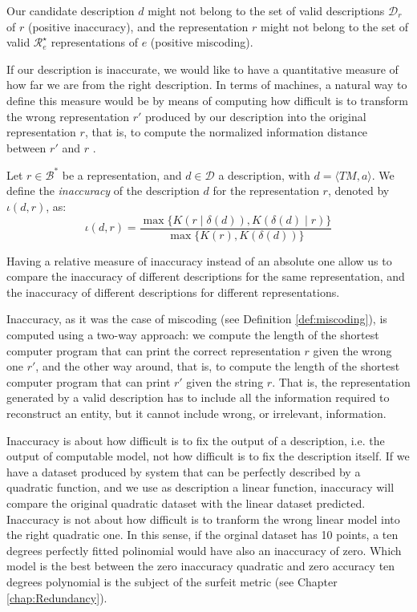 Our candidate description $d$ might not belong to the set of valid descriptions $\mathcal{D}_r$ of $r$ (positive inaccuracy), and the representation $r$ might not belong to the set of valid $\mathcal{R}^\star_e$ representations of $e$ (positive miscoding).

If our description is inaccurate, we would like to have a quantitative measure of how far we are from the right description. In terms of machines, a natural way to define this measure would be by means of computing how difficult is to transform the wrong representation $r'$ produced by our description into the original representation $r$, that is, to compute the normalized information distance between $r'$ and $r$ .

\begin{definition} [Inaccuracy]
\label{def:inaccuracy:inaccuracy:inaccuracy}
Let $r \in \mathcal{B}^\ast$ be a representation, and $d \in \mathcal{D}$ a description, with $d = \langle TM, a \rangle$. We define the \emph{inaccuracy} of the description $d$ for the representation $r$, denoted by $\iota(d, r)$, as:
\[
\iota(d, r) = \frac{ \max\{ K \left(r \mid \delta(d) \right), K \left( \delta(d) \mid r \right) \} } { \max\{ K(r), K \left(\delta(d) \right) \} }
\]
\end{definition}

Having a relative measure of inaccuracy instead of an absolute one allow us to compare the inaccuracy of different descriptions for the same representation, and the inaccuracy of different descriptions for different representations.

Inaccuracy, as it was the case of miscoding (see Definition \ref{def:miscoding}), is computed using a two-way approach: we compute the length of the shortest computer program that can print the correct representation $r$ given the wrong one $r'$, and the other way around, that is, to compute the length of the shortest computer program that can print $r'$ given the string $r$. That is, the representation generated by a valid description has to include all the information required to reconstruct an entity, but it cannot include wrong, or irrelevant, information. 

\begin{example}
Inaccuracy is about how difficult is to fix the output of a description, i.e. the output of computable model, not how difficult is to fix the description itself. If we have a dataset produced by system that can be perfectly described by a quadratic function, and we use as description a linear function, inaccuracy will compare the original quadratic dataset with the linear dataset predicted. Inaccuracy is not about how difficult is to tranform the wrong linear model into the right quadratic one. In this sense, if the orginal dataset has 10 points, a ten degrees perfectly fitted polinomial would have also an inaccuracy of zero. Which model is the best between the zero inaccuracy quadratic and zero accuracy ten degrees polynomial is the subject of the surfeit metric (see Chapter \ref{chap:Redundancy}).
\end{example}

